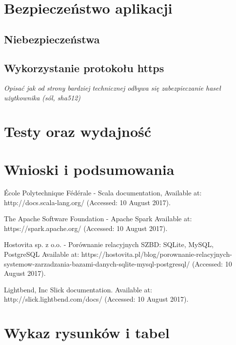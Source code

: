 \documentclass[a4paper,12pt,twoside]{article}
\begin{document}
\section{Bezpieczeństwo aplikacji}  
\subsection{Niebezpieczeństwa}
\subsection{Wykorzystanie protokołu https}
\textit{Opisać jak od strony bardziej technicznej odbywa się zabezpieczanie haseł użytkownika (sól, sha512) }
\newpage
\section{Testy oraz wydajność}  
\newpage
\section{Wnioski i podsumowania}  

\newpage
\begin{thebibliography}{99}

École Polytechnique Fédérale - Scala documentation,
Available at: http://docs.scala-lang.org/ (Accessed: 10 August 2017).

The Apache Software Foundation - Apache Spark Available at: https://spark.apache.org/ (Accessed: 10 August 2017).

Hostovita sp. z o.o. - Porównanie relacyjnych SZBD: SQLite, MySQL, PostgreSQL
Available at:
https://hostovita.pl/blog/porownanie-relacyjnych-systemow-zarzadzania-bazami-danych-sqlite-mysql-postgresql/ (Accessed: 10 August 2017).

Lightbend, Inc Slick documentation. Available at:
http://slick.lightbend.com/docs/ (Accessed: 10 August 2017).
\end{thebibliography}

\newpage
\section*{Wykaz rysunków i tabel} 
\end{document}
